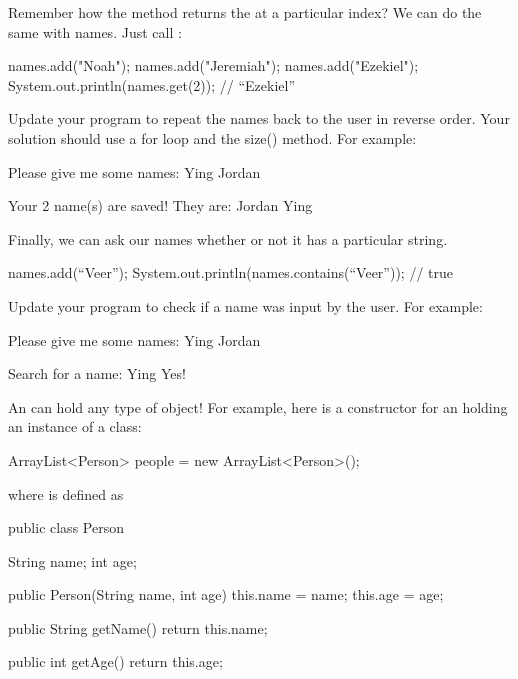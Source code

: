 Remember how the  method returns the  at a particular index? We can do the same with names. Just call :

\begin{code}
names.add("Noah");
names.add("Jeremiah");
names.add("Ezekiel");
System.out.println(names.get(2)); // ``Ezekiel''
\end{code}

\begin{example}
Update your program to repeat the names back to the user in reverse order. Your solution should use a for loop and the size() method. For example:

\begin{monospace}
Please give me some names:
Ying
Jordan

Your 2 name(s) are saved! They are:
Jordan
Ying
\end{monospace}
\end{example}

Finally, we can ask our names  whether or not it has a particular string.

\begin{code}
names.add(``Veer'');
System.out.println(names.contains(``Veer'')); // true
\end{code}

\begin{example}
Update your program to check if a name was input by the user. For example:

\begin{monospace}
Please give me some names:
Ying
Jordan

Search for a name:
Ying
Yes!
\end{monospace}
\end{example}

An  can hold any type of object! For example, here is a constructor for an  holding an instance of a  class:

\begin{code}
ArrayList<Person> people = new ArrayList<Person>();
\end{code}

where  is defined as

\begin{code}
public class Person {

    String name;
    int age;

    public Person(String name, int age) {
        this.name = name;
        this.age = age;
    }

    public String getName() {
        return this.name;
    }

    public int getAge() {
        return this.age;
    }
}
\end{code}

